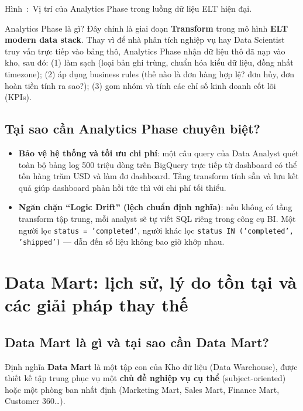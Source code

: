 \documentclass[12pt]{article}
\newcounter{hinh}
\newcommand{\capfig}[1]{%
  \refstepcounter{hinh}%
    Hình~\thehinh:~#1
}
\begin{document}
\begin{figurecaptionmodern}
\capfig{Vị trí của Analytics Phase trong luồng dữ liệu ELT hiện đại.}
\end{figurecaptionmodern}

\begin{infobox}{Analytics Phase là gì?}
Đây chính là giai đoạn \textbf{Transform} trong mô hình \textbf{ELT modern data stack}. Thay vì để nhà phân tích nghiệp vụ hay Data Scientist truy vấn trực tiếp vào bảng thô, Analytics Phase nhận dữ liệu thô đã nạp vào kho, sau đó: (1) làm sạch (loại bản ghi trùng, chuẩn hóa kiểu dữ liệu, đồng nhất timezone); (2) áp dụng business rules (thế nào là đơn hàng hợp lệ? đơn hủy, đơn hoàn tiền tính ra sao?); (3) gom nhóm và tính các chỉ số kinh doanh cốt lõi (KPIs).
\end{infobox}

\subsection{Tại sao cần Analytics Phase chuyên biệt?}

\begin{itemize}
    \item \textbf{Bảo vệ hệ thống và tối ưu chi phí}: một câu query của Data Analyst quét toàn bộ bảng log 500 triệu dòng trên BigQuery trực tiếp từ dashboard có thể tốn hàng trăm USD và làm đơ dashboard. Tầng transform tính sẵn và lưu kết quả giúp dashboard phản hồi tức thì với chi phí tối thiểu.
    \item \textbf{Ngăn chặn ``Logic Drift'' (lệch chuẩn định nghĩa)}: nếu không có tầng transform tập trung, mỗi analyst sẽ tự viết SQL riêng trong công cụ BI. Một người lọc \texttt{status = 'completed'}, người khác lọc \texttt{status IN ('completed', 'shipped')} --- dẫn đến số liệu không bao giờ khớp nhau.
\end{itemize}

\section{Data Mart: lịch sử, lý do tồn tại và các giải pháp thay thế}

\subsection{Data Mart là gì và tại sao cần Data Mart?}

\begin{infobox}{Định nghĩa}
\textbf{Data Mart} là một tập con của Kho dữ liệu (Data Warehouse), được thiết kế tập trung phục vụ một \textbf{chủ đề nghiệp vụ cụ thể} (subject-oriented) hoặc một phòng ban nhất định (Marketing Mart, Sales Mart, Finance Mart, Customer 360\ldots).
\end{infobox}
\end{document}
